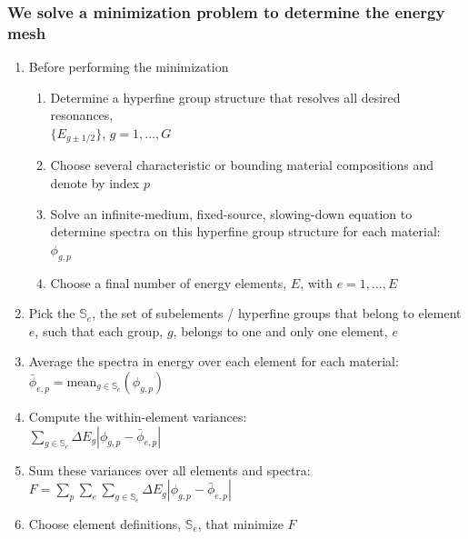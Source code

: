 \documentclass[compress,10pt]{beamer}
\begin{document}
\typeout{***********************************************************************************}

\begin{frame}
   \frametitle{We solve a minimization problem to determine the energy mesh}

   \begin{block}{}
   \begin{enumerate}
       \item<1-> Before performing the minimization
       \begin{enumerate}
           \item<2-> Determine a hyperfine group structure that resolves all desired resonances, \\ $\{E_{g\pm1/2}\}$, $g=1,\ldots,G$
           \item<3-> Choose several characteristic or bounding material compositions and \\denote by index $p$
           \item<4-> Solve an infinite-medium, fixed-source, slowing-down equation to determine spectra on this hyperfine group structure for each material: $\phi_{g,p}$
           \item<5-> Choose a final number of energy elements, $E$, with $e=1,\ldots,E$
       \end{enumerate}
       \item<6-> Pick the $\mathbb{S}_e$, the set of subelements / hyperfine groups that belong to element $e$, such that each group, $g$, belongs to one and only one element, $e$
       \item<7-> Average the spectra in energy over each element for each material: \\
           $\bar{\phi}_{e,p} = \text{mean}_{g \in \mathbb{S}_e} (\phi_{g,p})$
       \item<8-> Compute the within-element variances: \\
           $\sum_{g \in \mathbb{S}_e} \Delta E_g | \phi_{g,p} - \bar{\phi}_{e,p}|$
       \item<9-> Sum these variances over all elements and spectra: \\
           $F = \sum\limits_{p} \sum\limits_{e} \sum\limits_{g \in \mathbb{S}_e} \Delta E_g | \phi_{g,p} - \bar{\phi}_{e,p} | $
       \item<10-> Choose element definitions, $\mathbb{S}_e$, that minimize $F$
   \end{enumerate}
   \end{block}

\end{frame}
\end{document}
